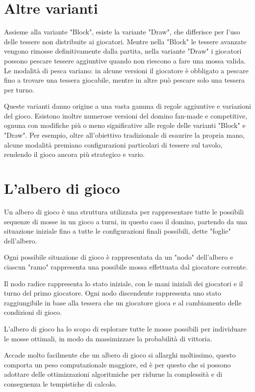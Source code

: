 \documentclass[a4paper,12pt]{report} %
\begin{document}
\section{Altre varianti}

Assieme alla variante "Block", esiste la variante "Draw", che differisce per l'uso delle tessere non distribuite ai giocatori. Mentre nella "Block" le tessere avanzate vengono rimosse definitivamente dalla partita, nella variante "Draw" i giocatori possono pescare tessere aggiuntive quando non riescono a fare una mossa valida. Le modalità di pesca variano: in alcune versioni il giocatore è obbligato a pescare fino a trovare una tessera giocabile, mentre in altre può pescare solo una tessera per turno.


Queste varianti danno origine a una vasta gamma di regole aggiuntive e variazioni del gioco. Esistono inoltre numerose versioni del domino fan-made e competitive, ognuna con modifiche più o meno significative alle regole delle varianti "Block" e "Draw". Per esempio, oltre all’obiettivo tradizionale di esaurire la propria mano, alcune modalità premiano configurazioni particolari di tessere sul tavolo, rendendo il gioco ancora più strategico e vario.

\section{L'albero di gioco}

Un albero di gioco è una struttura utilizzata per rappresentare tutte le possibili sequenze di mosse in un gioco a turni, in questo caso il domino, partendo da una situazione iniziale fino a tutte le configurazioni finali possibili, dette "foglie" dell'albero. 

Ogni possibile situazione di gioco è rappresentata da un "nodo" dell'albero e ciascun "ramo" rappresenta una possibile mossa effettuata dal giocatore corrente.

Il nodo radice rappresenta lo stato iniziale, con le mani iniziali dei giocatori e il turno del primo giocatore. Ogni nodo discendente rappresenta uno stato raggiungibile in base alla tessera che un giocatore gioca e al cambiamento delle condizioni di gioco.

L’albero di gioco ha lo scopo di esplorare tutte le mosse possibili per individuare le mosse ottimali, in modo da massimizzare la probabilità di vittoria. 

Accade molto facilmente che un albero di gioco si allarghi moltissimo, questo comporta un peso computazionale maggiore, ed è per questo che si possono adottare delle ottimizzazioni algoritmiche per ridurne la complessità e di conseguenza le tempistiche di calcolo.
\end{document}
